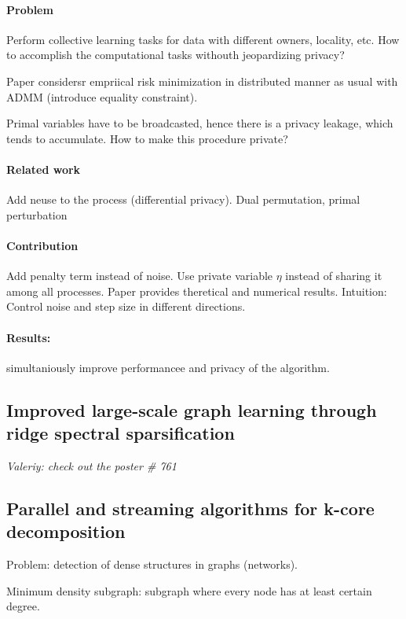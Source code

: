 \documentclass[11pt,oneside,a4paper]{scrartcl}
\newcommand{\valeriy}[1]{{\color{blue}\textit{Valeriy: #1}}}
\begin{document}
\paragraph{Problem}
Perform collective learning tasks for data with different owners,
locality, etc. How to accomplish the computational tasks withouth
jeopardizing privacy?

Paper considersr empriical risk minimization in distributed manner as
usual with ADMM (introduce equality constraint).

Primal variables have to be broadcasted, hence there is a privacy
leakage, which tends to accumulate. How to make this procedure private?

\paragraph{Related work}
Add neuse to the process (differential privacy). Dual permutation,
primal perturbation


\paragraph{Contribution}
Add penalty term instead of noise. Use private variable $\eta$ instead
of sharing it among all processes. Paper provides theretical and
numerical results. Intuition: Control noise and step size in different
directions.

\paragraph{Results:}
simultaniously improve performancee and privacy of the algorithm.


\subsection{Improved large-scale graph learning through ridge spectral
  sparsification \cite{calandriello18a}}

\valeriy{check out the poster \# 761}

\subsection{Parallel and streaming algorithms for k-core
  decomposition}
\label{sec:paralle-land-stre}

Problem: detection of dense structures in graphs (networks).

Minimum density subgraph: subgraph where every node has at least certain
degree.
\end{document}
